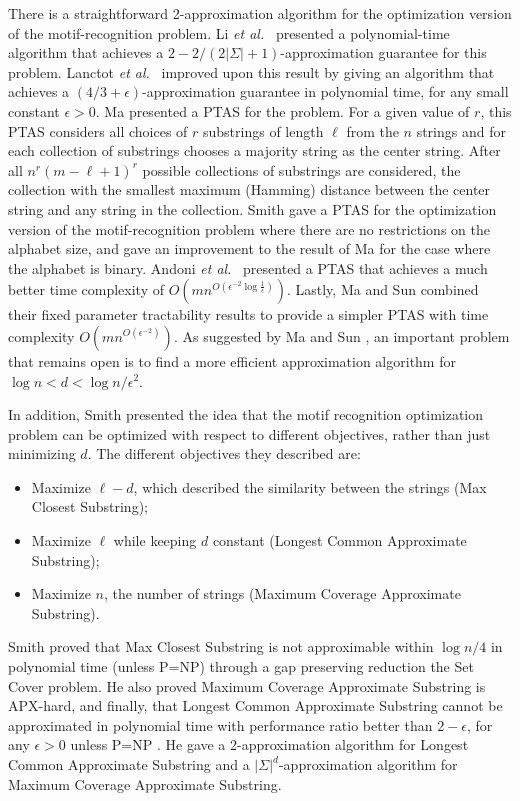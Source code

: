 There is a straightforward 2-approximation algorithm for the optimization version of the motif-recognition problem. Li {\em et al.}\ \cite{LMW02} presented a polynomial-time algorithm that achieves a $2 - 2/(2|\Sigma| + 1)$-approximation guarantee for this problem. Lanctot {\em et al.}\ \cite{LLMWZ00} improved upon this result by giving an algorithm that achieves a $(4/3 + \epsilon)$-approximation guarantee in polynomial time, for any small constant $\epsilon > 0$. Ma \cite{ma00} presented a PTAS for the problem.   For a given value of $r$, this PTAS  considers all choices of $r$ substrings of length $\ell$ from the $n$ strings and for each collection of substrings chooses a majority string as the center string.  After all $n^r(m - \ell + 1)^r$ possible collections of substrings are considered, the collection with the smallest maximum (Hamming) distance between the center string and any string in the collection. Smith \cite{asmith} gave a PTAS for the optimization version of the motif-recognition problem where there are no restrictions on the alphabet size, and gave an improvement to the result of Ma \cite{ma00} for the case where the alphabet is binary.  Andoni {\em et al.}\ \cite{AIP} presented a PTAS that achieves a much better time complexity of $O\left(mn^{O(\epsilon^{-2} \log \frac{1}{\epsilon})}\right)$.  Lastly, Ma and Sun \cite{MS08} combined their fixed parameter tractability results to provide a simpler PTAS with time complexity $O\left(mn^{O(\epsilon^{-2})} \right)$.  As suggested by Ma and Sun \cite{MS08}, an important problem that remains open is to find a more efficient approximation algorithm for $\log n < d < \log n / \epsilon^2$.  

In addition, Smith \cite{asmith} presented the idea that the motif recognition optimization problem can be optimized with respect to different objectives, rather than just minimizing $d$.  The different objectives they described are: 
\begin{itemize}
\item Maximize $\ell - d$, which described the similarity between the strings ({\sc Max Closest Substring});
\item Maximize $\ell$ while keeping $d$ constant ({\sc Longest Common Approximate Substring});
\item Maximize $n$, the number of strings ({\sc Maximum Coverage Approximate Substring}).  
\end{itemize}

Smith proved that {\sc Max Closest Substring} is not approximable within $\log n / 4$ in polynomial time (unless P=NP) through a gap preserving reduction the {\sc Set Cover} problem. He also proved {\sc Maximum Coverage Approximate Substring} is APX-hard, and finally, that {\sc Longest Common Approximate Substring} cannot be approximated in polynomial time with performance ratio better than $2 - \epsilon$, for any $\epsilon >0$ unless P=NP \cite{asmith}.  He gave a 2-approximation algorithm for {\sc Longest Common Approximate Substring} and a $|\Sigma|^d$-approximation algorithm for {\sc Maximum Coverage Approximate Substring}.  

